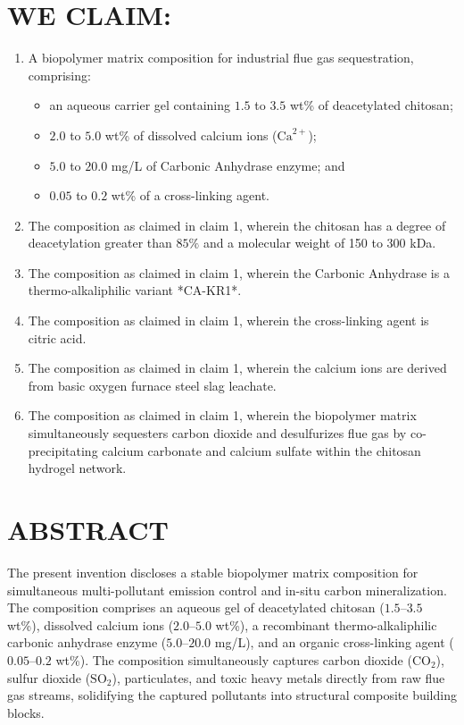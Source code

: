 \documentclass[12pt,a4paper]{article}
\begin{document}
\newpage

\section*{WE CLAIM:}
\begin{enumerate}
    \item A biopolymer matrix composition for industrial flue gas sequestration, comprising:
    \begin{itemize}
        \item an aqueous carrier gel containing $1.5$ to $3.5$ wt\% of deacetylated chitosan;
        \item $2.0$ to $5.0$ wt\% of dissolved calcium ions ($\text{Ca}^{2+}$);
        \item $5.0$ to $20.0$ mg/L of Carbonic Anhydrase enzyme; and
        \item $0.05$ to $0.2$ wt\% of a cross-linking agent.
    \end{itemize}
    
    \item The composition as claimed in claim 1, wherein the chitosan has a degree of deacetylation greater than $85\%$ and a molecular weight of 150 to 300 kDa.
    
    \item The composition as claimed in claim 1, wherein the Carbonic Anhydrase is a thermo-alkaliphilic variant *CA-KR1*.
    
    \item The composition as claimed in claim 1, wherein the cross-linking agent is citric acid.
    
    \item The composition as claimed in claim 1, wherein the calcium ions are derived from basic oxygen furnace steel slag leachate.
    
    \item The composition as claimed in claim 1, wherein the biopolymer matrix simultaneously sequesters carbon dioxide and desulfurizes flue gas by co-precipitating calcium carbonate and calcium sulfate within the chitosan hydrogel network.
\end{enumerate}

\newpage

\section*{ABSTRACT}
The present invention discloses a stable biopolymer matrix composition for simultaneous multi-pollutant emission control and in-situ carbon mineralization. The composition comprises an aqueous gel of deacetylated chitosan ($1.5$--$3.5$ wt\%), dissolved calcium ions ($2.0$--$5.0$ wt\%), a recombinant thermo-alkaliphilic carbonic anhydrase enzyme ($5.0$--$20.0$ mg/L), and an organic cross-linking agent ($0.05$--$0.2$ wt\%). The composition simultaneously captures carbon dioxide ($\text{CO}_2$), sulfur dioxide ($\text{SO}_2$), particulates, and toxic heavy metals directly from raw flue gas streams, solidifying the captured pollutants into structural composite building blocks.
\end{document}
